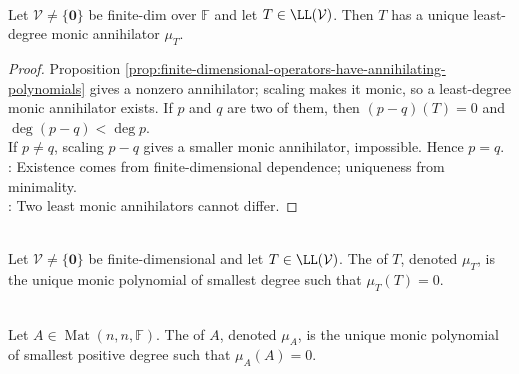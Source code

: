 \begin{theorem} \label{thm:operator-minimal-polynomial-existence} \\
Let $\mathcal{V}\neq\{\mathbf{0}\}$ be finite-dim over $\mathbb{F}$ and let $T\in\LL(\mathcal{V})$. Then $T$ has a unique least-degree monic annihilator $\mu_T$.
\begin{proof}
Proposition \ref{prop:finite-dimensional-operators-have-annihilating-polynomials} gives a nonzero annihilator; scaling makes it monic, so a least-degree monic annihilator exists. If $p$ and $q$ are two of them, then $(p-q)(T)=0$ and $\deg(p-q)<\deg p$.\\
If $p\neq q$, scaling $p-q$ gives a smaller monic annihilator, impossible. Hence $p=q$.\\
: Existence comes from finite-dimensional dependence; uniqueness from minimality.\\
: Two least monic annihilators cannot differ.
\end{proof}
\end{theorem}

\begin{definition} \label{def:operator-minimal-polynomial} \\
Let $\mathcal{V}\neq\{\mathbf{0}\}$ be finite-dimensional and let $T\in\LL(\mathcal{V})$. The  of $T$, denoted $\mu_T$, is the unique monic polynomial of smallest degree such that $\mu_T(T)=0$.
\end{definition}

\begin{definition} \label{def:minimal-polynomial-matrix} \\
Let $A\in\operatorname{Mat}(n,n,\mathbb{F})$. The  of $A$, denoted $\mu_A$, is the unique monic polynomial of smallest positive degree such that $\mu_A(A)=0$.
\end{definition}

